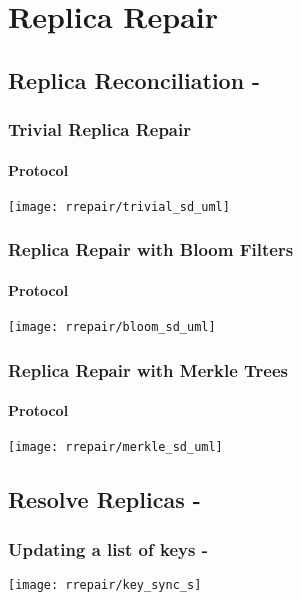 \chapter{Replica Repair}
\label{chapter.rrepair}

\section{Replica Reconciliation - }

\subsection{Trivial Replica Repair}
\subsubsection{Protocol}
\texttt{[image: rrepair/trivial\_sd\_uml]}

\subsection{Replica Repair with Bloom Filters}
\subsubsection{Protocol}
\texttt{[image: rrepair/bloom\_sd\_uml]}

\subsection{Replica Repair with Merkle Trees}
\subsubsection{Protocol}
\texttt{[image: rrepair/merkle\_sd\_uml]}



\section{Resolve Replicas - }
\subsection{Updating a list of keys - }
\texttt{[image: rrepair/key\_sync\_s]}
